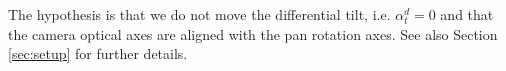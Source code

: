 The hypothesis is that we do not move the differential tilt, i.e. 
$\alpha_t^d = 0$ and that the camera optical axes are aligned 
with the pan rotation axes. See also Section \ref{sec:setup} 
for further details.